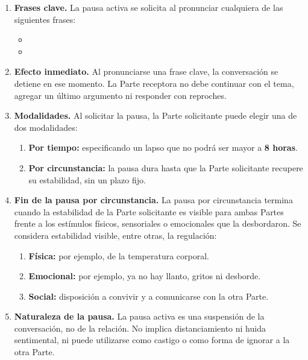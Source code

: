 \begin{enumerate}[label=\arabic*., leftmargin=*, itemsep=0.3em]
  \item \textbf{Frases clave.} La pausa activa se solicita al pronunciar cualquiera de las siguientes frases:
  \begin{itemize}[itemsep=0.1em]
    \item {}
    \item {}
  \end{itemize}

  \item \textbf{Efecto inmediato.} Al pronunciarse una frase clave, la conversación se detiene en ese momento. La Parte receptora no debe continuar con el tema, agregar un último argumento ni responder con reproches.

  \item \textbf{Modalidades.} Al solicitar la pausa, la Parte solicitante puede elegir una de dos modalidades:
  \begin{enumerate}[label=\alph*), itemsep=0.2em]
    \item \textbf{Por tiempo:} especificando un lapso que no podrá ser mayor a \textbf{8 horas}.
    \item \textbf{Por circunstancia:} la pausa dura hasta que la Parte solicitante recupere su estabilidad, sin un plazo fijo.
  \end{enumerate}

  \item \textbf{Fin de la pausa por circunstancia.} La pausa por circunstancia termina cuando la estabilidad de la Parte solicitante es visible para ambas Partes frente a los estímulos físicos, sensoriales o emocionales que la desbordaron. Se considera estabilidad visible, entre otras, la regulación:
  \begin{enumerate}[label=\alph*), itemsep=0.2em]
    \item \textbf{Física:} por ejemplo, de la temperatura corporal.
    \item \textbf{Emocional:} por ejemplo, ya no hay llanto, gritos ni desborde.
    \item \textbf{Social:} disposición a convivir y a comunicarse con la otra Parte.
  \end{enumerate}

  \item \textbf{Naturaleza de la pausa.} La pausa activa es una suspensión de la conversación, no de la relación. No implica distanciamiento ni huida sentimental, ni puede utilizarse como castigo o como forma de ignorar a la otra Parte.


\end{enumerate}
